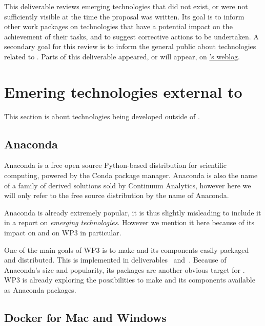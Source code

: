 \documentclass{deliverablereport}
\author{Erik Bray, Luca De Feo, Viviane Pons, Tom Wiesing}
\begin{document}
\maketitle

This deliverable reviews emerging technologies that did not exist, or
were not sufficiently visible at the time the \ODK proposal was
written. Its goal is to inform other work packages on technologies
that have a potential impact on the achievement of their tasks, and to
suggest corrective actions to be undertaken.  A secondary goal for
this review is to inform the general public about technologies related
to \ODK. Parts of this deliverable appeared, or will appear, on
\href{http://opendreamkit.org}{\ODK's weblog}.

\section{Emering technologies external to \ODK}
\label{sec:external}

This section is about technologies being developed outside of \ODK.

\subsection{Anaconda}
\label{sec:anaconda}

Anaconda is a free open source Python-based distribution for
scientific computing, powered by the Conda package manager. Anaconda
is also the name of a family of derived solutions sold by Continuum
Analytics, however here we will only refer to the free source
distribution by the name of Anaconda.

Anaconda is already extremely popular, it is thus slightly misleading
to include it in a report on \emph{emerging technologies}. However we
mention it here because of its impact on \ODK and on WP3 in
particular.

One of the main goals of WP3 is to make \Sage and its components
easily packaged and distributed. This is implemented in
deliverables~
and~. Because of
Anaconda's size and popularity, its packages are another obvious
target for \ODK. WP3 is already exploring the possibilities to make
\Sage and its components available as Anaconda packages.



\subsection{Docker for Mac and Windows}
\label{sec:docker}
\end{document}
